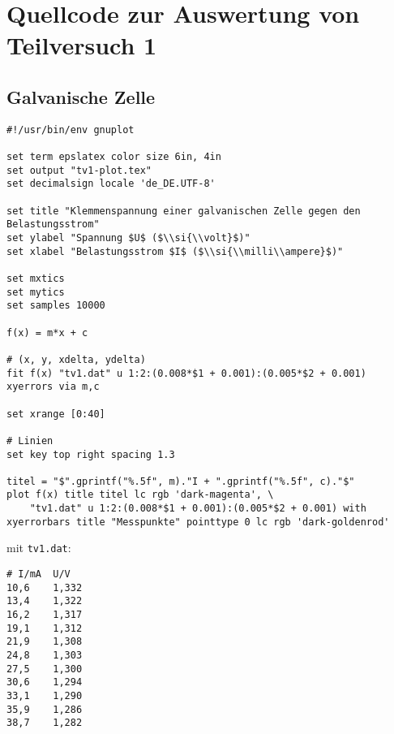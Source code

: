 \section{\gnuplot{} Quellcode zur Auswertung von Teilversuch 1}
    \subsection{Galvanische Zelle}
    \label{appdx:gnuplottv1}
    {  
        \renewcommand{\fcolorbox}[4][]{#4}
        \begin{verbatim}
#!/usr/bin/env gnuplot

set term epslatex color size 6in, 4in
set output "tv1-plot.tex"
set decimalsign locale 'de_DE.UTF-8'

set title "Klemmenspannung einer galvanischen Zelle gegen den Belastungsstrom"
set ylabel "Spannung $U$ ($\\si{\\volt}$)"
set xlabel "Belastungsstrom $I$ ($\\si{\\milli\\ampere}$)"

set mxtics
set mytics
set samples 10000

f(x) = m*x + c

# (x, y, xdelta, ydelta)
fit f(x) "tv1.dat" u 1:2:(0.008*$1 + 0.001):(0.005*$2 + 0.001) xyerrors via m,c

set xrange [0:40]

# Linien
set key top right spacing 1.3

titel = "$".gprintf("%.5f", m)."I + ".gprintf("%.5f", c)."$"
plot f(x) title titel lc rgb 'dark-magenta', \
    "tv1.dat" u 1:2:(0.008*$1 + 0.001):(0.005*$2 + 0.001) with xyerrorbars title "Messpunkte" pointtype 0 lc rgb 'dark-goldenrod'
        \end{verbatim}
    }
    mit \texttt{tv1.dat}:
    \begin{multicols}{2}
        \begin{verbatim}
# I/mA  U/V
10,6    1,332
13,4    1,322
16,2    1,317
19,1    1,312
21,9    1,308
24,8    1,303
27,5    1,300
30,6    1,294
33,1    1,290
35,9    1,286
38,7    1,282
        \end{verbatim}
    \end{multicols}
    \vspace{-\baselineskip}
